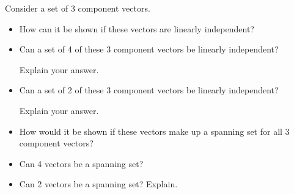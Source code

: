 \documentclass{ximera}
\begin{document}
\begin{exercise}%
    Consider a set of 3 component vectors.
    \begin{itemize}
        \item How can it be shown if these vectors are linearly independent?
        \item Can a set of 4 of these 3 component vectors be linearly independent? 
        \begin{multipleChoice}
        \end{multipleChoice} 
        \begin{problem}
            Explain your answer.
        \end{problem}
        \item Can a set of 2 of these 3 component vectors be linearly independent?
        \begin{multipleChoice}
        \end{multipleChoice} 
        \begin{problem}
            Explain your answer.
        \end{problem}
        \item How would it be shown if these vectors make up a spanning set for all 3 component vectors?
        \item Can 4 vectors be a spanning set? 
        \begin{multipleChoice}
        \end{multipleChoice} 
        \item Can 2 vectors be a spanning set? Explain.
        \begin{multipleChoice}
        \end{multipleChoice} 
    \end{itemize}
\end{exercise}
\end{document}
